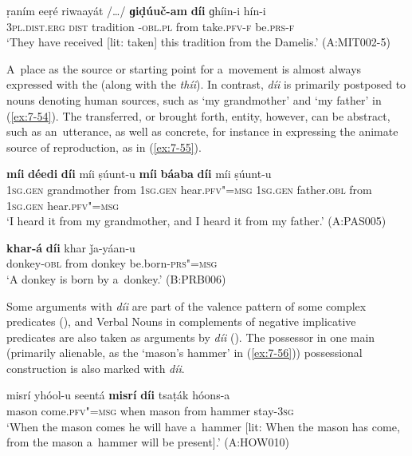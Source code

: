 \begin{exe}
\ex
\label{ex:7-53}
\gll ṛaním eeṛé riwaayát /{\ldots}/ \textbf{ɡiḍúuč-am} \textbf{díi}  ɡhíin-i hín-i \\
\textsc{3pl.dist.erg} \textsc{dist} tradition {} \iliDameli-\textsc{obl.pl} from take.\textsc{pfv-f} be.\textsc{prs-f}\\
\glt `They have received [lit: taken] this tradition from the Damelis.' (A:MIT002-5)
\end{exe}

A~place as the source or starting point for a~movement is almost always expressed with the  (along with the  \textit{thíi}). In contrast, \textit{díi} is primarily postposed to nouns denoting human sources, such as `my grandmother' and `my father' in (\ref{ex:7-54}). The transferred, or brought forth, entity, however, can be abstract, such as an~utterance, as well as concrete, for instance in expressing the animate source of reproduction, as in (\ref{ex:7-55}).

\begin{exe}
\ex
\label{ex:7-54}
\gll \textbf{míi} \textbf{déedi} \textbf{díi} míi ṣúunt-u \textbf{míi} \textbf{báaba} \textbf{díi} míi ṣúunt-u\\
\textsc{1sg.gen} grandmother from \textsc{1sg.gen} hear.\textsc{pfv"=msg} \textsc{1sg.gen} father.\textsc{obl} from \textsc{1sg.gen} hear.\textsc{pfv"=msg}\\
\glt `I heard it from my grandmother, and I heard it from my father.' (A:PAS005)

\ex
\label{ex:7-55}
\gll \textbf{khar-á} \textbf{díi} khar ǰa-yáan-u \\
donkey-\textsc{obl} from donkey be.born\textsf{-}\textsc{prs"=msg} \\
\glt `A donkey is born by a~donkey.' (B:PRB006)
\end{exe}

Some arguments with \textit{díi} are part of the valence pattern of some complex predicates (), and Verbal Nouns in complements of negative implicative predicates are also taken as arguments by \textit{díi} (). The possessor in one main (primarily alienable, as the `mason's hammer' in (\ref{ex:7-56})) possessional construction is also marked with \textit{díi}.

\begin{exe}
\ex
\label{ex:7-56}
\gll misrí yhóol-u seentá \textbf{misrí} \textbf{díi} tsaṭák hóons-a \\
mason come.\textsc{pfv"=msg} when mason from hammer stay-\textsc{3sg} \\
\glt `When the mason comes he will have a~hammer [lit: When the mason has come, from the mason a~hammer will be present].'  (A:HOW010)
\end{exe}

